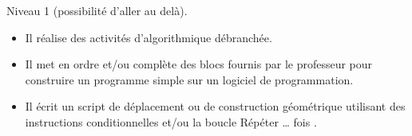 \begin{prerequis}[Objectifs de 5\up{e}]
    Niveau 1 (possibilité d'aller au delà).  
    \begin{itemize}  
        \item Il réalise des activités d’algorithmique débranchée.
        \item Il met en ordre et/ou complète des blocs fournis par le professeur pour construire un programme simple sur un logiciel de programmation.
        \columnbreak
        \item Il écrit un script de déplacement ou de construction géométrique utilisant des instructions conditionnelles et/ou la boucle \og Répéter \dots{} fois \fg.
      \end{itemize}
\end{prerequis}